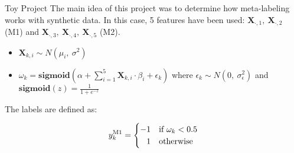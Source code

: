 \documentclass{beamer} %
\begin{document}
\begin{frame}{Toy Project}
	The main idea of this project was to determine how meta-labeling 
	works with synthetic data. In this case, 5 features have been 
	used: $\textbf{X}_{\cdot, 1}, \ 
	\textbf{X}_{\cdot, 2}$ (M1) and 
	$\textbf{X}_{\cdot, 3},\ 
	\textbf{X}_{\cdot, 4},\ 
	\textbf{X}_{\cdot, 5}$ (M2).\\
	
	\begin{itemize}
		\item $\textbf{X}_{k, i} \sim N(\mu_i,\ \sigma^2)$
		\item $\omega_k = \textbf{sigmoid} \left( \alpha + 
		\sum_{i = 1}^{5} \textbf{X}_{k,i} \cdot \beta_i + \epsilon_k 
		\right)$ where $\epsilon_k \sim N(0,\ \sigma_{\epsilon}^2)$ 
		and $\textbf{sigmoid}(z) = \frac{1}{1 + e^{-z}}$
	\end{itemize}
	
	\vspace{.2cm}
	
	The labels are defined as:

	\begin{equation*}
		y_k^{\text{M1}} =
	    \begin{cases}
	      -1 & \text{if}\ \omega_k < 0.5 \\
	      \hfill 1 & \text{otherwise} 
	    \end{cases}
	\end{equation*}
\end{frame}
\end{document}

